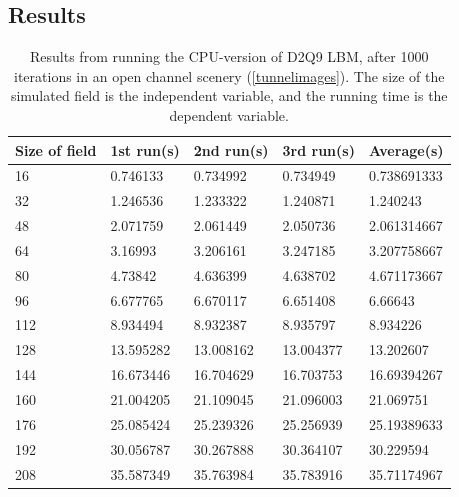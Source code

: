 \subsection{Results}
\begin{table}[H]
\centering
\begin{tabular}{lllll}
\toprule
Size	 of field &1st run(s)&	2nd run(s)&	3rd run(s) &	Average(s)\\
\midrule
16&	0.746133&	0.734992&	0.734949&	0.738691333\\
32&	1.246536&	1.233322&	1.240871&	1.240243\\
48&	2.071759&	2.061449&	2.050736&	2.061314667\\
64&	3.16993&		3.206161&	3.247185&	3.207758667\\
80&	4.73842&		4.636399&	4.638702&	4.671173667\\
96&	6.677765&	6.670117&	6.651408&	6.66643\\
112&	8.934494&	8.932387&	8.935797&	8.934226\\
128&	13.595282&	13.008162&	13.004377&	13.202607\\
144&	16.673446&	16.704629&	16.703753&	16.69394267\\
160&	21.004205&	21.109045&	21.096003&	21.069751\\
176&	25.085424&	25.239326&	25.256939&	25.19389633\\
192&	30.056787&	30.267888&	30.364107&	30.229594\\
208&	35.587349&	35.763984&	35.783916&	35.71174967\\
\bottomrule
\end{tabular}
\caption{Results from running the CPU-version of D2Q9 LBM, after 1000 iterations in an open channel scenery (\autoref{tunnelimages}). The size of the simulated field is the independent variable, and the running time is the dependent variable.}
\label{resultcpu}
\end{table}


